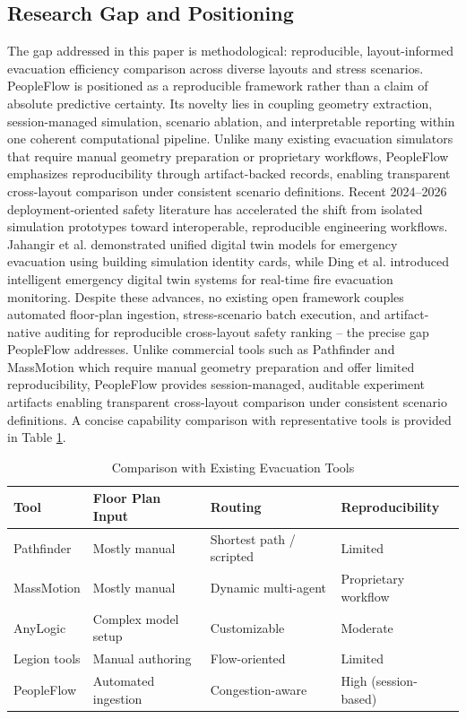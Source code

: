 \documentclass[utf8]{FrontiersinHarvard}
\begin{document}
\subsection{Research Gap and Positioning}
The gap addressed in this paper is methodological: reproducible, layout-informed evacuation efficiency comparison across diverse layouts and stress scenarios. PeopleFlow is positioned as a reproducible framework rather than a claim of absolute predictive certainty. Its novelty lies in coupling geometry extraction, session-managed simulation, scenario ablation, and interpretable reporting within one coherent computational pipeline.
Unlike many existing evacuation simulators that require manual geometry preparation or proprietary workflows, PeopleFlow emphasizes reproducibility through artifact-backed records, enabling transparent cross-layout comparison under consistent scenario definitions.
Recent 2024--2026 deployment-oriented safety literature has accelerated the shift from isolated simulation prototypes toward interoperable, reproducible engineering workflows. Jahangir et al. \cite{jahangir2025dt} demonstrated unified digital twin models for emergency evacuation using building simulation identity cards, while Ding et al. \cite{ding2023jbe} introduced intelligent emergency digital twin systems for real-time fire evacuation monitoring. Despite these advances, no existing open framework couples automated floor-plan ingestion, stress-scenario batch execution, and artifact-native auditing for reproducible cross-layout safety ranking -- the precise gap PeopleFlow addresses. Unlike commercial tools such as Pathfinder and MassMotion which require manual geometry preparation and offer limited reproducibility, PeopleFlow provides session-managed, auditable experiment artifacts enabling transparent cross-layout comparison under consistent scenario definitions.
A concise capability comparison with representative tools is provided in Table \ref{tab:tool_comparison}.

\begin{table}[t]
\centering
\caption{Comparison with Existing Evacuation Tools}
\label{tab:tool_comparison}
{\scriptsize
\setlength{\tabcolsep}{3pt}
\begin{tabular}{>{\raggedright\arraybackslash}p{1.60cm} >{\raggedright\arraybackslash}p{1.20cm} >{\raggedright\arraybackslash}p{1.95cm} >{\raggedright\arraybackslash}p{2.00cm}}
\toprule
Tool & Floor Plan Input & Routing & Reproducibility \\
\midrule
Pathfinder & Mostly manual & Shortest path / scripted & Limited \\
MassMotion & Mostly manual & Dynamic multi-agent & Proprietary workflow \\
AnyLogic & Complex model setup & Customizable & Moderate \\
Legion tools & Manual authoring & Flow-oriented & Limited \\
PeopleFlow & Automated ingestion & Congestion-aware & High (session-based) \\
\bottomrule
\end{tabular}
}
\end{table}
\end{document}
